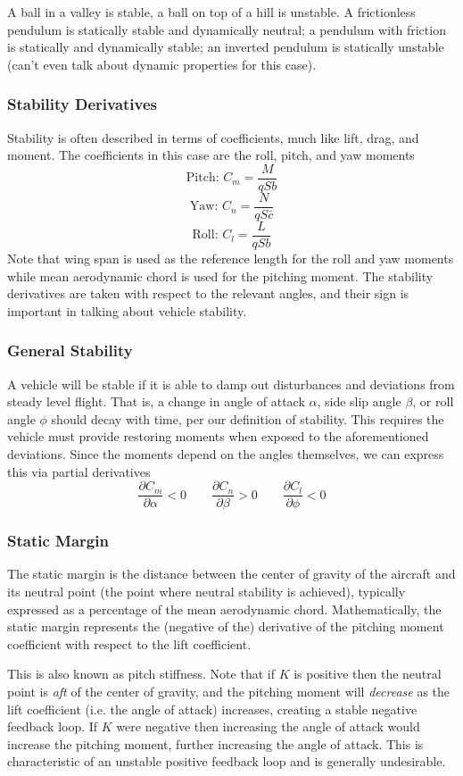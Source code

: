 \documentclass[11pt]{article}
\newcommand{\CenteredBoxed}[1]{\begin{center}\boxed{#1}\end{center}}
\newcommand{\Partial}[2]{\frac{\partial #1}{\partial #2}}
\begin{document}
A ball in a valley is stable, a ball on top of a hill is unstable. A frictionless pendulum is statically stable and dynamically neutral; a pendulum with friction is statically and dynamically stable; an inverted pendulum is statically unstable (can't even talk about dynamic properties for this case).
\subsubsection{Stability Derivatives}
Stability is often described in terms of coefficients, much like lift, drag, and moment. The coefficients in this case are the roll, pitch, and yaw moments
$$\textrm{Pitch: }C_m = \frac{M}{qSb}$$
$$\textrm{Yaw: }C_n = \frac{N}{qS\bar{c}}$$
$$\textrm{Roll: }C_l = \frac{L}{qSb}$$
Note that wing span is used as the reference length for the roll and yaw moments while mean aerodynamic chord is used for the pitching moment. The stability derivatives are taken with respect to the relevant angles, and their sign is important in talking about vehicle stability.

\subsubsection{General Stability}
A vehicle will be stable if it is able to damp out disturbances and deviations from steady level flight. That is, a change in angle of attack $\alpha$, side slip angle $\beta$, or roll angle $\phi$ should decay with time, per our definition of stability. This requires the vehicle must provide restoring moments when exposed to the aforementioned deviations. Since the moments depend on the angles themselves, we can express this via partial derivatives
$$\Partial{C_m}{\alpha}<0\qquad\Partial{C_n}{\beta}>0\qquad\Partial{C_l}{\phi}<0$$

\subsubsection{Static Margin}
The static margin is the distance between the center of gravity of the aircraft and its neutral point (the point where neutral stability is achieved), typically expressed as a percentage of the mean aerodynamic chord. Mathematically, the static margin represents the (negative of the) derivative of the pitching moment coefficient with respect to the lift coefficient. 
\CenteredBoxed{\Partial{C_M}{C_L}=-\left(\frac{x_{NP}-x_{cg}}{MAC}\right) = -K}

This is also known as pitch stiffness. Note that if $K$ is positive then the neutral point is \emph{aft} of the center of gravity, and the pitching moment will \emph{decrease} as the lift coefficient (i.e. the angle of attack) increases, creating a stable negative feedback loop. If $K$ were negative then increasing the angle of attack would increase the pitching moment, further increasing the angle of attack. This is characteristic of an unstable positive feedback loop and is generally undesirable.
\end{document}
